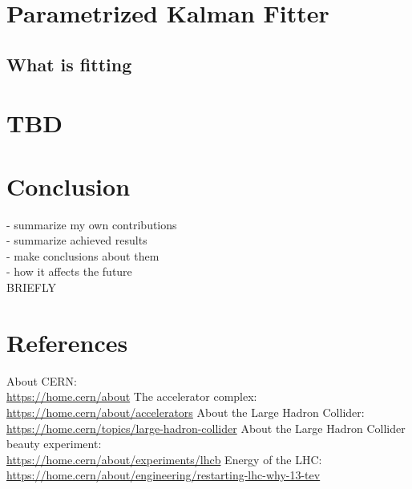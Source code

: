 \documentclass[12pt]{article}
\begin{document}
	\section{Parametrized Kalman Fitter}
	
	\subsection{What is fitting}
	
	\section{TBD}
	
	\section{Conclusion}
	
	\color{red}
	- summarize my own contributions \\
	- summarize achieved results \\
	- make conclusions about them \\
	- how it affects the future \\
	BRIEFLY
	\color{black}

	
	\section{References}
	
	\begin{thebibliography}{asd}
		 About CERN: \\
			\url{https://home.cern/about}
		 The accelerator complex: \\
			\url{https://home.cern/about/accelerators}
		 About the Large Hadron Collider: \\
			\url{https://home.cern/topics/large-hadron-collider}
		 About the Large Hadron Collider beauty experiment: \\
			\url{https://home.cern/about/experiments/lhcb}
		 Energy of the LHC: \\
			\url{https://home.cern/about/engineering/restarting-lhc-why-13-tev}
	\end{thebibliography}
\end{document}
